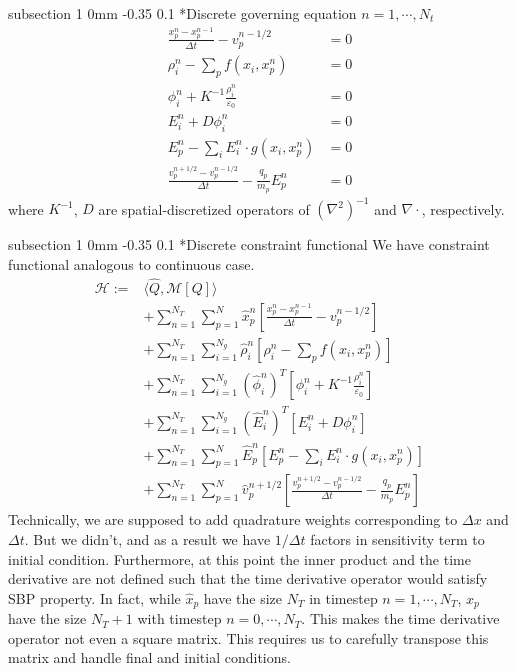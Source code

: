 \documentclass[11pt]{article}
\makeatletter
\renewcommand{\subsection}{\@startsection
{subsection}%
{1}%
{0mm}%
{-0.35\baselineskip}%
{0.1\baselineskip}%
{\normalfont\large\bfseries\color{brown}}}%
\newcommand{\vp}{v_p}
\newcommand{\xp}{x_p}
\newcommand{\Dt}{\Delta t}
\newcommand{\vph}{\hat{v}_p}
\newcommand{\xph}{\hat{x}_p}
\newcommand{\Eh}{\hat{E}}
\newcommand{\phih}{\hat{\phi}}
\newcommand{\rhoh}{\hat{\rho}}
\newcommand{\cH}{\mathcal{H}}
\makeatother
\begin{document}
\subsection*{Discrete governing equation}
$n=1,\cdots,N_t$
\begin{equation*}
\begin{split}
\frac{\xp^{n} - \xp^{n-1}}{\Dt} - \vp^{n-1/2} &= 0\\
\rho_{i}^n - \sum\limits_p f\left( x_{i}, x_p^n \right) &= 0\\
\phi_i^n + K^{-1}\frac{\rho_i^n}{\varepsilon_0} &= 0\\
E_i^n + D\phi_i^n &= 0\\
E_{p}^{n} - \sum\limits_{i}E_{i}^{n}\cdot g\left( x_{i}, x_p^{n} \right) &= 0\\
\frac{\vp^{n+1/2} - \vp^{n-1/2}}{\Dt} - \frac{q_p}{m_p}E_p^{n} &= 0
\end{split}
\end{equation*}
where $K^{-1}$, $D$ are spatial-discretized operators of $(\nabla^2)^{-1}$ and $\nabla\cdot$, respectively.

\subsection*{Discrete constraint functional}
We have constraint functional analogous to continuous case.
\begin{equation*}
\begin{split}
\cH :=& \langle \hat{Q}, \mathcal{M}[Q] \rangle\\
&+ \sum_{n=1}^{N_T}\sum_{p=1}^{N}\xph^{n}\left[ \frac{\xp^{n} - \xp^{n-1}}{\Dt} - \vp^{n-1/2} \right]\\
&+ \sum_{n=1}^{N_T}\sum_{i=1}^{N_g}\rhoh_{i}^n\left[ \rho_{i}^n - \sum\limits_p f\left( x_{i}, x_p^n \right) \right]\\
&+ \sum_{n=1}^{N_T}\sum_{i=1}^{N_g}\left( \phih_i^{n} \right)^T\left[ \phi_i^n + K^{-1}\frac{\rho_i^n}{\varepsilon_0} \right]\\
&+ \sum_{n=1}^{N_T}\sum_{i=1}^{N_g}\left( \Eh_i^n \right)^T\left[ E_i^n + D\phi_i^n \right]\\
&+ \sum_{n=1}^{N_T}\sum_{p=1}^{N}\Eh_{p}^{n}\left[ E_{p}^{n} - \sum\limits_{i}E_{i}^{n}\cdot g\left( x_{i}, x_p^{n} \right) \right]\\
&+ \sum_{n=1}^{N_T}\sum_{p=1}^{N}\vph^{n+1/2}\left[ \frac{\vp^{n+1/2} - \vp^{n-1/2}}{\Dt} - \frac{q_p}{m_p}E_p^{n} \right]
\end{split}
\end{equation*}
Technically, we are supposed to add quadrature weights corresponding to $\Delta x$ and $\Delta t$.
But we didn't, and as a result we have $1/\Delta t$ factors in sensitivity term to initial condition.
Furthermore, at this point the inner product and the time derivative are not defined such that
the time derivative operator would satisfy SBP property.
In fact, while $\xph$ have the size $N_T$ in timestep $n=1,\cdots,N_T$,
$\xp$ have the size $N_T+1$ with timestep $n=0,\cdots,N_T$.
This makes the time derivative operator not even a square matrix.
This requires us to carefully transpose this matrix and handle final and initial conditions.
\clearpage
\end{document}
